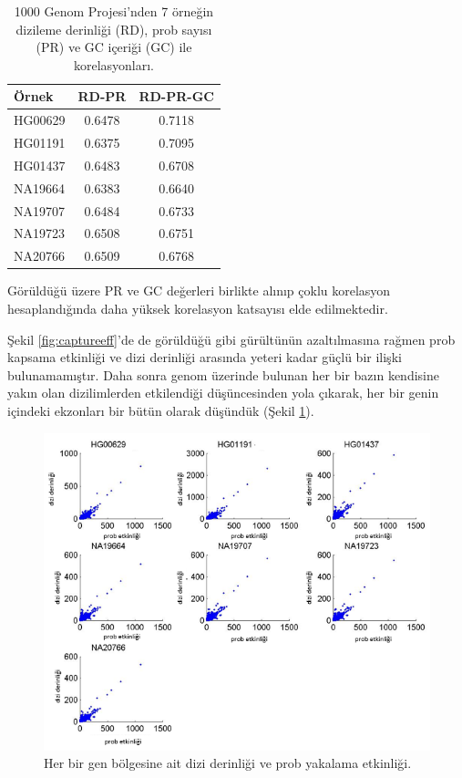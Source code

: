 \documentclass[11pt]{article}
\begin{document}
\begin{table}[htb]
\caption{1000 Genom Projesi'nden 7 örneğin dizileme derinliği (RD), prob sayısı (PR) ve GC içeriği (GC) ile korelasyonları.}
\label{tab:correlation}
\begin{center}
\begin{tabular}{|l|c|c|}
\hline 
{\bf Örnek } & {\bf RD-PR} & {\bf RD-PR-GC}\\
\hline 
HG00629 & 0.6478 & 0.7118\\
HG01191 & 0.6375 & 0.7095\\
HG01437 & 0.6483 & 0.6708\\
NA19664 & 0.6383 & 0.6640\\
NA19707 & 0.6484 & 0.6733\\
NA19723 & 0.6508 & 0.6751\\
NA20766 & 0.6509 & 0.6768\\
\hline
\end{tabular}
\end{center}
\vspace*{0.5cm}
 Görüldüğü üzere PR ve GC değerleri birlikte alınıp çoklu korelasyon hesaplandığında daha yüksek korelasyon katsayısı elde edilmektedir.
\end{table}

 Şekil \ref{fig:captureeff}'de de görüldüğü gibi gürültünün azaltılmasına rağmen prob kapsama etkinliği ve dizi derinliği arasında yeteri kadar güçlü bir ilişki bulunamamıştır. Daha sonra genom üzerinde bulunan her bir bazın kendisine yakın olan dizilimlerden etkilendiği düşüncesinden yola 
çıkarak, her bir genin içindeki ekzonları bir bütün olarak düşündük (Şekil \ref{fig:captureeffgene}).

\begin{figure}[htb]
\begin{center}
  \includegraphics[scale=0.65]{captureeff-gene.png}
\end{center}
\caption{Her bir gen bölgesine ait dizi derinliği ve prob yakalama etkinliği.}
\label{fig:captureeffgene}
\end{figure}
\end{document}
